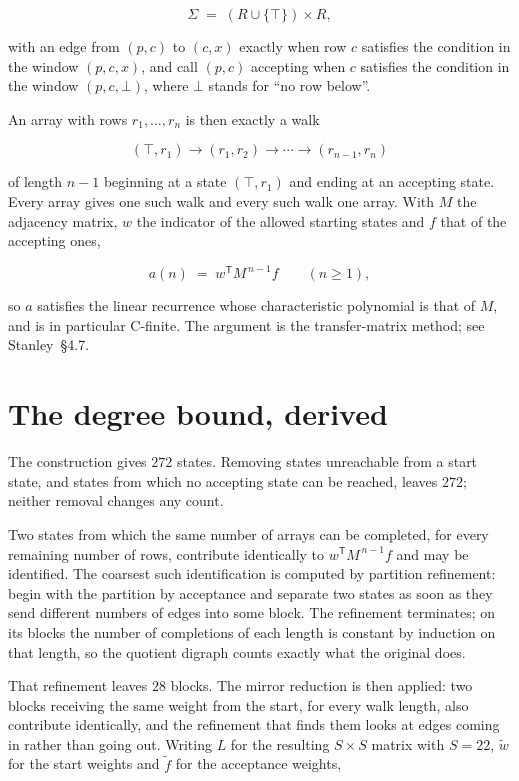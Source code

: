 \documentclass[11pt]{article}
\theoremstyle{definition}
\begin{document}
\[\Sigma \;=\; (R \cup \{\top\}) \times R,\]

with an edge from $(p,c)$ to $(c,x)$ exactly when row $c$ satisfies the condition in the window $(p,c,x)$, and call $(p,c)$ accepting when $c$ satisfies the condition in the window $(p,c,\bot)$, where $\bot$ stands for ``no row below''.

An array with rows $r_1,\dots,r_n$ is then exactly a walk

\[(\top,r_1) \to (r_1,r_2) \to \cdots \to (r_{n-1},r_n)\]

of length $n-1$ beginning at a state $(\top,r_1)$ and ending at an accepting state. Every array gives one such walk and every such walk one array. With $M$ the adjacency matrix, $w$ the indicator of the allowed starting states and $f$ that of the accepting ones,

\[a(n) \;=\; w^{\mathsf T} M^{\,n-1} f \qquad (n \ge 1),\]

so $a$ satisfies the linear recurrence whose characteristic polynomial is that of $M$, and is in particular C-finite. The argument is the transfer-matrix method; see Stanley~\S4.7.

\section{The degree bound, derived}

The construction gives $272$ states. Removing states unreachable from a start state, and states from which no accepting state can be reached, leaves $272$; neither removal changes any count.

Two states from which the same number of arrays can be completed, for every remaining number of rows, contribute identically to $w^{\mathsf T}M^{\,n-1}f$ and may be identified. The coarsest such identification is computed by partition refinement: begin with the partition by acceptance and separate two states as soon as they send different numbers of edges into some block. The refinement terminates; on its blocks the number of completions of each length is constant by induction on that length, so the quotient digraph counts exactly what the original does.

That refinement leaves $28$ blocks. The mirror reduction is then applied: two blocks receiving the same weight from the start, for every walk length, also contribute identically, and the refinement that finds them looks at edges coming in rather than going out. Writing $L$ for the resulting $S \times S$ matrix with $S = 22$, $\tilde w$ for the start weights and $\tilde f$ for the acceptance weights,
\end{document}
